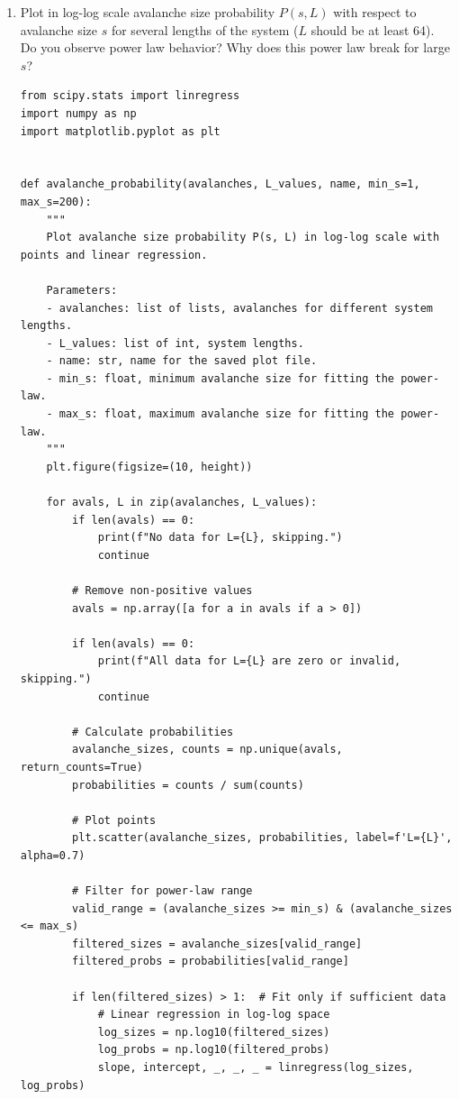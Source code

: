 \documentclass[10pt,letterpaper, onecolumn]{report}
\begin{document}
\begin{flushleft}
\begin{enumerate}
            \hfill\break
            \item Plot in log-log scale avalanche size probability $P (s, L)$ with respect to avalanche size $s$ for several
            lengths of the system ($L$ should be at least 64). Do you observe power law behavior? Why does this
            power law break for large $s$?
            \hfill\break
            \begin{lstlisting}[style=myPythonStyle, caption={Oslo Model Algorithm (Python version 3.11.7)}]
from scipy.stats import linregress
import numpy as np
import matplotlib.pyplot as plt


def avalanche_probability(avalanches, L_values, name, min_s=1, max_s=200):
    """
    Plot avalanche size probability P(s, L) in log-log scale with points and linear regression.

    Parameters:
    - avalanches: list of lists, avalanches for different system lengths.
    - L_values: list of int, system lengths.
    - name: str, name for the saved plot file.
    - min_s: float, minimum avalanche size for fitting the power-law.
    - max_s: float, maximum avalanche size for fitting the power-law.
    """
    plt.figure(figsize=(10, height))

    for avals, L in zip(avalanches, L_values):
        if len(avals) == 0:
            print(f"No data for L={L}, skipping.")
            continue

        # Remove non-positive values
        avals = np.array([a for a in avals if a > 0])

        if len(avals) == 0:
            print(f"All data for L={L} are zero or invalid, skipping.")
            continue

        # Calculate probabilities
        avalanche_sizes, counts = np.unique(avals, return_counts=True)
        probabilities = counts / sum(counts)

        # Plot points
        plt.scatter(avalanche_sizes, probabilities, label=f'L={L}', alpha=0.7)

        # Filter for power-law range
        valid_range = (avalanche_sizes >= min_s) & (avalanche_sizes <= max_s)
        filtered_sizes = avalanche_sizes[valid_range]
        filtered_probs = probabilities[valid_range]

        if len(filtered_sizes) > 1:  # Fit only if sufficient data
            # Linear regression in log-log space
            log_sizes = np.log10(filtered_sizes)
            log_probs = np.log10(filtered_probs)
            slope, intercept, _, _, _ = linregress(log_sizes, log_probs)


\end{lstlisting}
\end{enumerate}
\end{flushleft}
\end{document}
